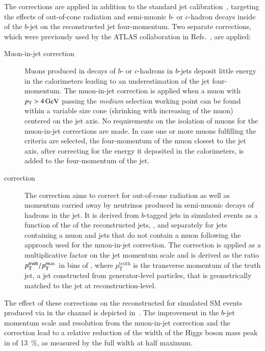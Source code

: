 The corrections are applied in addition to the standard jet
calibration~\cite{JETM-2018-05}, targeting the effects of out-of-cone
radiation and semi-muonic $b$- or $c$-hadron decays inside of the
$b$-jet on the reconstructed jet four-momentum. Two separate
corrections, which were previously used by the ATLAS collaboration in
Refs.~\cite{HIGG-2016-29,HIGG-2018-04,HIGG-2018-51}, are applied:
\begin{description}

\item[Muon-in-jet correction] Muons produced in decays of $b$- or
  $c$-hadrons in $b$-jets deposit little energy in the calorimeters
  leading to an underestimation of the jet four-momentum. The
  muon-in-jet correction is applied when a muon with
  $\pT > \SI{4}{\GeV}$ passing the \emph{medium} selection working
  point can be found within a variable size cone (shrinking with
  increasing \pT of the muon) centered on the jet axis. No
  requirements on the isolation of muons for the muon-in-jet
  corrections are made. In case one or more muons fulfilling the
  criteria are selected, the four-momentum of the muon closest to the
  jet axis, after correcting for the energy it deposited in the
  calorimeters, is added to the four-momentum of the jet.

\item[\pTreco correction] The \pTreco correction aims to correct for
  out-of-cone radiation as well as momentum carried away by neutrinos
  produced in semi-muonic decays of hadrons in the jet. It is derived
  from $b$-tagged jets in simulated \ttbar events as a function of the
  \pT of the reconstructed jets, \pTreco, and separately for jets
  containing a muon and jets that do not contain a muon following the
  approach used for the muon-in-jet correction. The correction is
  applied as a multiplicative factor on the jet momentum scale and is
  derived as the ratio $p_{\text{T}}^{\text{truth}} / p_{\text{T}}^{\text{reco.}}$ in bins
  of \pTreco, where $p_{\text{T}}^{\text{truth}}$ is the transverse
  momentum of the truth jet, a jet constructed from generator-level
  particles, that is geometrically matched to the jet at
  reconstruction-level.

\end{description}

The effect of these corrections on the reconstructed \mBB for
simulated SM \HH events produced via \ggF in the \hadhad channel is
depicted in~. The improvement in the
$b$-jet momentum scale and resolution from the muon-in-jet correction
and the \pTreco correction lead to a relative reduction of the width
of the Higgs boson mass peak in \mBB of \SI{13}{\percent}, as measured
by the full width at half maximum.

